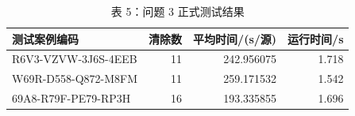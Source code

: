 \begin{table}[htbp]
\centering
\caption{表 5：问题 3 正式测试结果}

\small
\begin{tabular}{@{}lrrr@{}}
\toprule
测试案例编码 & 清除数 & 平均时间/(s/源) & 运行时间/s \\
\midrule
R6V3-\discretionary{}{}{}VZVW-\discretionary{}{}{}3J6S-\discretionary{}{}{}4EEB & 11 & 242.956075 & 1.718 \\
W69R-\discretionary{}{}{}D558-\discretionary{}{}{}Q872-\discretionary{}{}{}M8FM & 11 & 259.171532 & 1.542 \\
69A8-\discretionary{}{}{}R79F-\discretionary{}{}{}PE79-\discretionary{}{}{}RP3H & 16 & 193.335855 & 1.696 \\
\bottomrule
\end{tabular}

\end{table}
